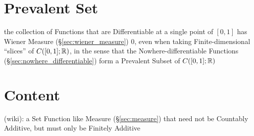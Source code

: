 \section{Prevalent Set}\label{sec:prevalent_set}

the collection of Functions that are Differentiable at a single point of
$[0,1]$ has Wiener Measure (\S\ref{sec:wiener_measure}) $0$, even when taking
Finite-dimensional ``slices'' of $C([0,1];\mathbb{R})$, in the sense that the
Nowhere-differentiable Functions (\S\ref{sec:nowhere_differentiable}) form a
Prevalent Subset of $C([0,1]; \mathbb{R})$



\section{Content}\label{sec:content}

(wiki): a Set Function like Measure (\S\ref{sec:measure}) that need not be
Countably Additive, but must only be Finitely Additive
